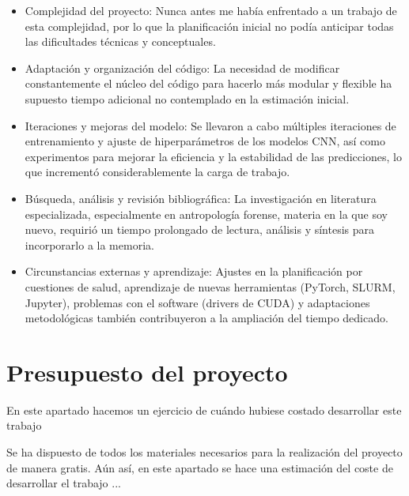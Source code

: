 \begin{itemize}

    \item Complejidad del proyecto: Nunca antes me había enfrentado a un trabajo de esta complejidad, por lo que la planificación inicial no podía anticipar todas las dificultades técnicas y conceptuales.
    
    \item Adaptación y organización del código: La necesidad de modificar constantemente el núcleo del código para hacerlo más modular y flexible ha supuesto tiempo adicional no contemplado en la estimación inicial.
    
    \item Iteraciones y mejoras del modelo: Se llevaron a cabo múltiples iteraciones de entrenamiento y ajuste de hiperparámetros de los modelos CNN, así como experimentos para mejorar la eficiencia y la estabilidad de las predicciones, lo que incrementó considerablemente la carga de trabajo.
    
    \item Búsqueda, análisis y revisión bibliográfica: La investigación en literatura especializada, especialmente en antropología forense, materia en la que soy nuevo, requirió un tiempo prolongado de lectura, análisis y síntesis para incorporarlo a la memoria.
    
    \item Circunstancias externas y aprendizaje: Ajustes en la planificación por cuestiones de salud, aprendizaje de nuevas herramientas (PyTorch, SLURM, Jupyter), problemas con el software (drivers de CUDA) y adaptaciones metodológicas también contribuyeron a la ampliación del tiempo dedicado.

\end{itemize}


\section{Presupuesto del proyecto}

En este apartado hacemos un ejercicio de cuándo hubiese costado desarrollar este trabajo 

Se ha dispuesto de todos los materiales necesarios para la realización del proyecto de manera gratis. Aún así, en este apartado se hace una estimación del coste de desarrollar el trabajo ... 


